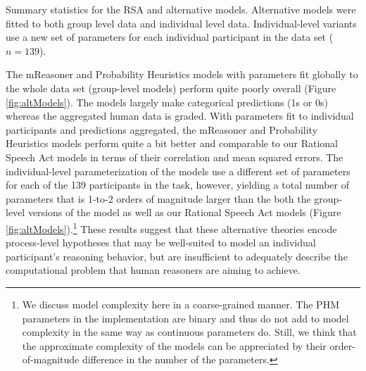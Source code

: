 \documentclass[floatsintext, doc]{apa6}
\begin{document}
\begin{center}
\begin{table}[h]
\centering
{}\caption{Summary statistics for the RSA and alternative models. Alternative models were fitted to both group level data and individual level data. Individual-level variants use a new set of parameters for each individual participant in the data set ($n=139$).}\label{tab:altStats}
\end{table}
\end{center}


The mReasoner and Probability Heuristics models with parameters fit globally to the whole data set (group-level models) perform quite poorly overall (Figure \ref{fig:altModels}). 
The models largely make categorical predictions (1s or 0s) whereas the aggregated human data is graded.
With parameters fit to individual participants and predictions aggregated, the mReasoner and Probability Heuristics models perform quite a bit better and comparable to our Rational Speech Act models in terms of their correlation and mean squared errors.
The individual-level parameterization of the models use a different set of parameters for each of the 139 participants in the task, however, yielding a total number of parameters that is 1-to-2 orders of magnitude larger than the both the group-level versions of the model as well as our Rational Speech Act models (Figure \ref{fig:altModels}).\footnote{We discuss model complexity here in a coarse-grained manner. The PHM parameters in the  implementation are binary and thus do not add to model complexity in the same way as continuous parameters do. Still, we think that the approximate complexity of the models can be appreciated by their order-of-magnitude difference in the number of the parameters.}
These results suggest that these alternative theories encode process-level hypotheses that may be well-suited to model an individual participant's reasoning behavior, but are insufficient to adequately describe the computational problem that human reasoners are aiming to achieve. 
\end{document}
